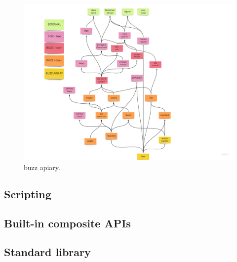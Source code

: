 \begin{figure}[htbp]
   \centering
   \includegraphics[width=1\textwidth]{fig/buzz-apiary.pdf}
   \caption[buzz apiary \statusgreen]{buzz apiary. }
   \label{fig:buzz-apiary}
\end{figure}

\subsection{Scripting \statusred}
\label{sec:buzz}

\subsection{Built-in composite APIs \statusred}
\label{sec:lego}

\subsection{Standard library \statusred}
\label{sec:stdlib}